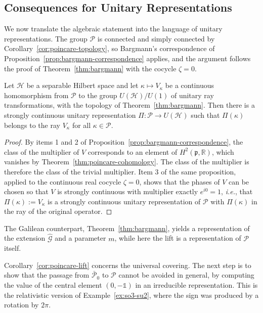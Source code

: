 	\subsection*{Consequences for Unitary Representations}
	
	We now translate the algebraic statement into the language of unitary representations. The group $\mathcal{P}$ is connected and simply connected by Corollary~\ref{cor:poincare-topology}, so Bargmann's correspondence of Proposition~\ref{prop:bargmann-correspondence} applies, and the argument follows the proof of Theorem~\ref{thm:bargmann} with the cocycle $\zeta=0$.
	
	\begin{corollary}\label{cor:poincare-lift}
		Let $\mathcal{H}$ be a separable Hilbert space and let $\kappa\mapsto V_\kappa$ be a continuous homomorphism from $\mathcal{P}$ to the group $U(\mathcal{H})/U(1)$ of unitary ray transformations, with the topology of Theorem~\ref{thm:bargmann}. Then there is a strongly continuous unitary representation $\Pi:\mathcal{P}\to U(\mathcal{H})$ such that $\Pi(\kappa)$ belongs to the ray $V_\kappa$ for all $\kappa\in\mathcal{P}$.
	\end{corollary}
	
	\begin{proof}
		By items 1 and 2 of Proposition~\ref{prop:bargmann-correspondence}, the class of the multiplier of $V$ corresponds to an element of $H^2(\mathfrak{p},\mathbb{R})$, which vanishes by Theorem~\ref{thm:poincare-cohomology}. The class of the multiplier is therefore the class of the trivial multiplier. Item 3 of the same proposition, applied to the continuous real cocycle $\zeta=0$, shows that the phases of $V$ can be chosen so that $V$ is strongly continuous with multiplier exactly $e^{i0}=1$, \textit{i.e.}, that $\Pi(\kappa):=V_\kappa$ is a strongly continuous unitary representation of $\mathcal{P}$ with $\Pi(\kappa)$ in the ray of the original operator.
	\end{proof}
	
	\noindent The Galilean counterpart, Theorem~\ref{thm:bargmann}, yields a representation of the extension $\widehat{\mathcal{G}}$ and a parameter $m$, while here the lift is a representation of $\mathcal{P}$ itself.
	
	Corollary~\ref{cor:poincare-lift} concerns the universal covering. The next step is to show that the passage from $\bar{\mathcal{P}}_0$ to $\mathcal{P}$ cannot be avoided in general, by computing the value of the central element $(0,-\mathbb{1})$ in an irreducible representation. This is the relativistic version of Example~\ref{ex:so3-su2}, where the sign was produced by a rotation by $2\pi$.
	
